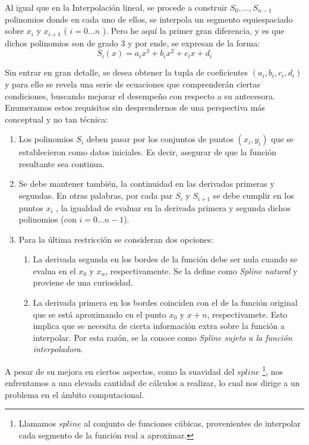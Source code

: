 Al igual que en la Interpolaci\'on lineal, se procede a construir $S_0,  \ldots , S_{n - 1}$ polinomios donde en cada uno de ellos, se interpola un segmento equiespaciado sobre $x_i$ y $x_{i + 1}$ ( $i = 0 \ldots n$ ). Pero he aqu\'i la primer gran diferencia, y es que dichos polinomios son de grado 3 y por ende, se expresan de la forma: \[ S_i(x) = a_i x^3 + b_i x^2 + c_i x + d_i \]

Sin entrar en gran detalle, se desea obtener la tupla de coeficientes $(a_i,b_i,c_i,d_i)$ y para ello se revela una serie de ecuaciones que comprender\'an ciertas condiciones, buscando mejorar el desempeño con respecto a su antecesora. Enumeramos estos requisitos sin desprendernos de una perspectiva m\'as conceptual y no tan t\'ecnica:

\begin{enumerate}
	\item Los polinomios $S_{i}$ deben pasar por los conjuntos de puntos $(x_{i},y_{i})$ que se establecieron como datos iniciales. Es decir, asegurar de que la funci\'on resultante sea continua.
	\item Se debe mantener tambi\'en, la continuidad en las derivadas primeras y segundas. En otras palabras, por cada par $S_{i}$ y $S_{i+1}$ se debe cumplir en los puntos $x_{i}$ , la igualdad de evaluar en la derivada primera y segunda dichos polinomios (con $i = 0 \ldots n-1$).
	\item Para la \'ultima restricci\'on se consideran dos opciones:
		\begin{enumerate}
			\item La derivada segunda en los bordes de la funci\'on debe ser nula cuando se evalua en el $x_0$ y $x_n$, respectivamente. Se la define como \textit{Spline natural} y proviene de una curiosidad.
			\item La derivada primera en los bordes coinciden con el de la funci\'on original que se est\'a aproximando en el punto $x_0$ y $x+n$, respectivamete. Esto implica que se necesita de cierta informaci\'on extra sobre la funci\'on a interpolar. Por esta raz\'on, se la conoce como \textit{Spline sujeto a la funci\'on interpoladora}.  
		\end{enumerate}
\end{enumerate}

A pesar de su mejora en ciertos aspectos, como la suavidad del $spline$ \footnote{Llamamos $spline$ al conjunto de funciones c\'ubicas, provenientes de interpolar cada segmento de la funci\'on real a aproximar.}, nos enfrentamos a una elevada cantidad de c\'alculos a realizar, lo cual nos dirige a un problema en el \'ambito computacional.
